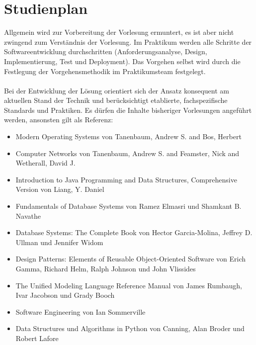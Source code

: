 \section{Studienplan}
Allgemein wird zur Vorbereitung der Vorlesung ermuntert, es ist aber nicht zwingend zum Verständnis der Vorlesung. 
Im Praktikum werden alle Schritte der Softwareentwicklung durchschritten (Anforderungsanalyse, Design, Implementierung, Test und Deployment). Das Vorgehen selbst wird durch die Festlegung der Vorgehensmethodik im Praktikumsteam festgelegt.
\\\\
Bei der Entwicklung der Lösung orientiert sich der Ansatz konsequent am aktuellen Stand der Technik und berücksichtigt etablierte, fachspezifische Standards und Praktiken. Es dürfen die Inhalte bisheriger Vorlesungen angeführt werden, ansonsten gilt als Referenz:

\begin{itemize}
\item Modern Operating Systems von Tanenbaum, Andrew S. and Bos, Herbert \cite{tanenbaum2022modern}
\item Computer Networks von Tanenbaum, Andrew S. and Feamster, Nick and Wetherall, David J. \cite{tanenbaum2021computer}
\item Introduction to Java Programming and Data Structures, Comprehensive Version von Liang, Y. Daniel \cite{liang2021java}
\item Fundamentals of Database Systems von Ramez Elmasri und Shamkant B. Navathe \cite{elmasri_navathe_2021}
\item Database Systems: The Complete Book von  Hector Garcia-Molina, Jeffrey D. Ullman und Jennifer Widom \cite{garcia_molina_ullman_widom_2011}
\item Design Patterns: Elements of Reusable Object-Oriented Software von  Erich Gamma, Richard Helm, Ralph Johnson und John Vlissides \cite{gamma1994design}
\item The Unified Modeling Language Reference Manual  von James Rumbaugh, Ivar Jacobson und Grady Booch \cite{rumbaugh_jacobson_booch_2004}
\item Software Engineering von  Ian Sommerville \cite{sommerville2015software}
\item Data Structures und Algorithms in Python von Canning, Alan Broder und Robert Lafore \cite{canning_broder_lafore_2023}
\end{itemize}
 
